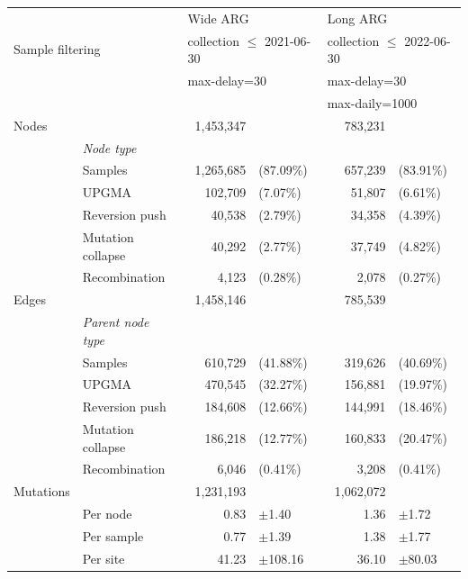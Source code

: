 \documentclass{article}
\begin{document}
\begin{table}
\begin{center}
    \begin{tabular}{llrlrl}\toprule
        &  & \multicolumn{2}{l}{Wide ARG} & \multicolumn{2}{l}{Long ARG} \\
    \cmidrule{3-6}
    \multicolumn{2}{l}{Sample filtering}
             & \multicolumn{2}{l}{collection $\leq$ 2021-06-30}
                 & \multicolumn{2}{l}{collection $\leq$ 2022-06-30} \\
           & & \multicolumn{2}{l}{max-delay=30} & \multicolumn{2}{l}{max-delay=30} \\
        &  & &                               & \multicolumn{2}{l}{max-daily=1000} \\
    \midrule

    Nodes & & 1,453,347 & & 783,231  & \\
     & \emph{Node type} & \\
    & Samples & 1,265,685 & (87.09\%) & 657,239 & (83.91\%) \\
    & UPGMA   & 102,709 & (7.07\%) & 51,807 & (6.61\%)  \\
    & Reversion push & 40,538 & (2.79\%) & 34,358 & (4.39\%)  \\
    & Mutation collapse & 40,292 & (2.77\%) & 37,749 & (4.82\%)  \\
    & Recombination & 4,123 & (0.28\%) & 2,078 & (0.27\%) \\
    \cmidrule{2-6}
    Edges & & 1,458,146 &  & 785,539 & \\
     & \emph{Parent node type} & \\
    & Samples & 610,729 & (41.88\%) & 319,626 & (40.69\%) \\
    & UPGMA   & 470,545 & (32.27\%) & 156,881 & (19.97\%)  \\
    & Reversion push & 184,608 & (12.66\%) & 144,991 & (18.46\%)  \\
    & Mutation collapse &186,218  & (12.77\%) & 160,833 & (20.47\%)  \\
    & Recombination & 6,046 & (0.41\%) & 3,208 & (0.41\%) \\
    \cmidrule{2-6}
    Mutations & & 1,231,193 &  & 1,062,072 & \\
    & Per node & 0.83  & $\pm$1.40 & 1.36 & $\pm$1.72 \\
    & Per sample & 0.77  & $\pm$1.39 & 1.38 & $\pm$1.77 \\
    & Per site & 41.23  & $\pm$108.16    & 36.10 & $\pm$80.03\\

\end{tabular}
\end{center}
\end{table}
\end{document}
